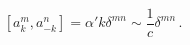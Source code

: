 \begin{equation}
\label{eq:flat-mode-comm}
   [a_k^m, a_{-k}^n] =
   \alpha' k\delta^{mn} \sim\frac{1}{c}\delta^{mn} \,.
\end{equation}

